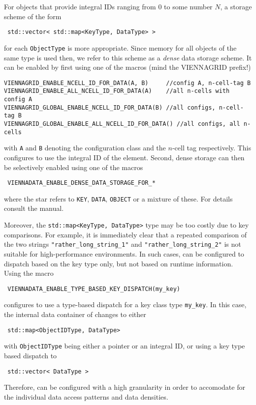 For objects that provide integral IDs ranging from $0$ to some number $N$, a storage scheme of the form
\begin{lstlisting}
 std::vector< std::map<KeyType, DataType> >
\end{lstlisting}
for each \lstinline|ObjectType| is more appropriate. Since memory for all objects of the same type is used then, we refer to this scheme as a \emph{dense} data storage scheme. It can be enabled by first using one of the macros (mind the VIENNAGRID prefix!)
\begin{lstlisting}
VIENNAGRID_ENABLE_NCELL_ID_FOR_DATA(A, B)     //config A, n-cell-tag B
VIENNAGRID_ENABLE_ALL_NCELL_ID_FOR_DATA(A)    //all n-cells with config A
VIENNAGRID_GLOBAL_ENABLE_NCELL_ID_FOR_DATA(B) //all configs, n-cell-tag B
VIENNAGRID_GLOBAL_ENABLE_ALL_NCELL_ID_FOR_DATA() //all configs, all n-cells
\end{lstlisting}
with \lstinline|A| and \lstinline|B| denoting the configuration class and the $n$-cell tag respectively. This configures {\ViennaData} to use the integral ID of the element. 
Second, dense storage can then be selectively enabled using one of the macros
\begin{lstlisting}
 VIENNADATA_ENABLE_DENSE_DATA_STORAGE_FOR_*
\end{lstlisting}
where the star refers to \lstinline|KEY|, \lstinline|DATA|, \lstinline|OBJECT| or a mixture of these. For details consult the {\ViennaData} manual.


Moreover, the \lstinline|std::map<KeyType, DataType>| type may be too costly due to key comparisons. For example, it is immediately clear that a repeated comparison of the two strings \lstinline|"rather_long_string_1"| and \lstinline|"rather_long_string_2"| is not suitable for high-performance environments. In such cases, {\ViennaData}
can be configured to dispatch based on the key type only, but not based on runtime information. Using the macro
\begin{lstlisting}
 VIENNADATA_ENABLE_TYPE_BASED_KEY_DISPATCH(my_key)
\end{lstlisting}
configures {\ViennaData} to use a type-based dispatch for a key class type \lstinline|my_key|. In this case, the internal data container of {\ViennaData}
changes to either
\begin{lstlisting}
 std::map<ObjectIDType, DataType>
\end{lstlisting}
with \lstinline|ObjectIDType| being either a pointer or an integral ID, or using a key type based dispatch to
\begin{lstlisting}
 std::vector< DataType >
\end{lstlisting}
Therefore, {\ViennaData} can be configured with a high granularity in order to accomodate for the individual data access patterns and data densities.

